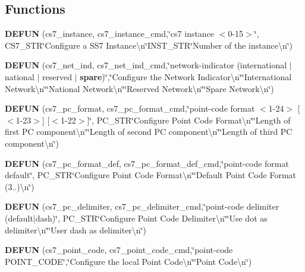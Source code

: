 \subsection*{Functions}
\begin{DoxyCompactItemize}
\item 
{\bf D\+E\+F\+UN} (cs7\+\_\+instance, cs7\+\_\+instance\+\_\+cmd,\char`\"{}cs7 instance $<$0-\/15$>$\char`\"{}, C\+S7\+\_\+\+S\+TR\char`\"{}Configure a S\+S7 Instance\textbackslash{}n\char`\"{}I\+N\+S\+T\+\_\+\+S\+TR\char`\"{}Number of the instance\textbackslash{}n\char`\"{})
\item 
{\bf D\+E\+F\+UN} (cs7\+\_\+net\+\_\+ind, cs7\+\_\+net\+\_\+ind\+\_\+cmd,\char`\"{}network-\/indicator (international $\vert$ national $\vert$ reserved $\vert$ {\bf spare})\char`\"{},\char`\"{}Configure the Network Indicator\textbackslash{}n\char`\"{}\char`\"{}International Network\textbackslash{}n\char`\"{}\char`\"{}National Network\textbackslash{}n\char`\"{}\char`\"{}Reserved Network\textbackslash{}n\char`\"{}\char`\"{}Spare Network\textbackslash{}n\char`\"{})
\item 
{\bf D\+E\+F\+UN} (cs7\+\_\+pc\+\_\+format, cs7\+\_\+pc\+\_\+format\+\_\+cmd,\char`\"{}point-\/code format $<$1-\/24$>$ [$<$1-\/23$>$] [$<$1-\/22$>$]\char`\"{}, P\+C\+\_\+\+S\+TR\char`\"{}Configure Point Code Format\textbackslash{}n\char`\"{}\char`\"{}Length of first PC component\textbackslash{}n\char`\"{}\char`\"{}Length of second PC component\textbackslash{}n\char`\"{}\char`\"{}Length of third PC component\textbackslash{}n\char`\"{})
\item 
{\bf D\+E\+F\+UN} (cs7\+\_\+pc\+\_\+format\+\_\+def, cs7\+\_\+pc\+\_\+format\+\_\+def\+\_\+cmd,\char`\"{}point-\/code format default\char`\"{}, P\+C\+\_\+\+S\+TR\char`\"{}Configure Point Code Format\textbackslash{}n\char`\"{}\char`\"{}Default Point Code Format (3..)\textbackslash{}n\char`\"{})
\item 
{\bf D\+E\+F\+UN} (cs7\+\_\+pc\+\_\+delimiter, cs7\+\_\+pc\+\_\+delimiter\+\_\+cmd,\char`\"{}point-\/code delimiter (default$\vert$dash)\char`\"{}, P\+C\+\_\+\+S\+TR\char`\"{}Configure Point Code Delimiter\textbackslash{}n\char`\"{}\char`\"{}Use dot as delimiter\textbackslash{}n\char`\"{}\char`\"{}User dash as delimiter\textbackslash{}n\char`\"{})
\item 
{\bf D\+E\+F\+UN} (cs7\+\_\+point\+\_\+code, cs7\+\_\+point\+\_\+code\+\_\+cmd,\char`\"{}point-\/code P\+O\+I\+N\+T\+\_\+\+C\+O\+DE\char`\"{},\char`\"{}Configure the local Point Code\textbackslash{}n\char`\"{}\char`\"{}Point Code\textbackslash{}n\char`\"{})

\end{DoxyCompactItemize}
